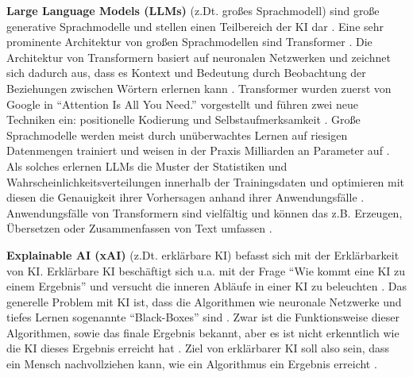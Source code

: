 \textbf{Large Language Models (LLMs)} (z.Dt. großes Sprachmodell) sind große generative Sprachmodelle und stellen einen Teilbereich der KI dar \cite{nvidia-llm}.
Eine sehr prominente Architektur von großen Sprachmodellen sind Transformer \cite{nvidia-llm}.
Die Architektur von Transformern basiert auf neuronalen Netzwerken und zeichnet sich dadurch aus, dass es Kontext und Bedeutung durch Beobachtung der Beziehungen zwischen Wörtern erlernen kann \cite{nvidia-llm}.
Transformer wurden zuerst von Google in \enquote{Attention Is All You Need.} \cite{google-attention} vorgestellt und führen zwei neue Techniken ein: positionelle Kodierung und Selbstaufmerksamkeit \cite{nvidia-llm}.
Große Sprachmodelle werden meist durch unüberwachtes Lernen auf riesigen Datenmengen trainiert und weisen in der Praxis Milliarden an Parameter auf \cite{nvidia-llm}.
Als solches erlernen LLMs die Muster der Statistiken und Wahrscheinlichkeitsverteilungen innerhalb der Trainingsdaten und optimieren mit diesen die Genauigkeit ihrer Vorhersagen anhand ihrer Anwendungsfälle \cite{towards-data-science-icl}.
Anwendungsfälle von Transformern sind vielfältig und können das z.B. Erzeugen, Übersetzen oder Zusammenfassen von Text umfassen \cite{nvidia-llm}.

\textbf{Explainable AI (xAI)} (z.Dt. erklärbare KI) befasst sich mit der Erklärbarkeit von KI.
Erklärbare KI beschäftigt sich u.a. mit der Frage \enquote{Wie kommt eine KI zu einem Ergebnis} und versucht die inneren Abläufe in einer KI zu beleuchten \cite{explainable-ai-kobold}.
Das generelle Problem mit KI ist, dass die Algorithmen wie neuronale Netzwerke und tiefes Lernen sogenannte \enquote{Black-Boxes} sind \cite{explainable-ai-kobold}.
Zwar ist die Funktionsweise dieser Algorithmen, sowie das finale Ergebnis bekannt, aber es ist nicht erkenntlich wie die KI dieses Ergebnis erreicht hat \cite{explainable-ai-kobold}.
Ziel von erklärbarer KI soll also sein, dass ein Mensch nachvollziehen kann, wie ein Algorithmus ein Ergebnis erreicht \cite{explainable-ai-kobold}.

